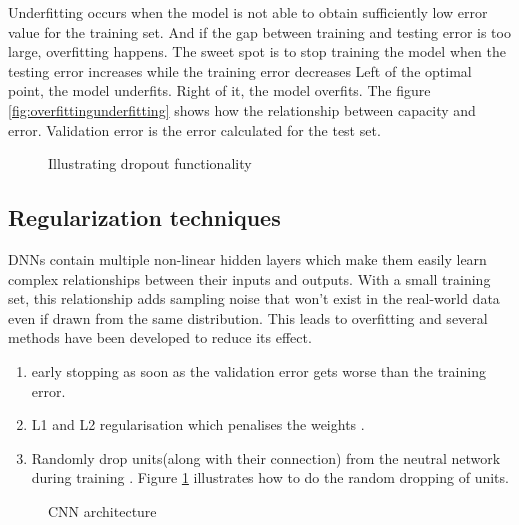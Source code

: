 Underfitting occurs when the model is not able to obtain sufficiently low error value for
the training set. And if the gap between training and testing error is too large,
overfitting happens. The sweet spot is to stop training the model when the testing error
increases while the training error  decreases
 \label{inside:formodelcheckpoint} Left of the optimal point, the model underfits. Right of
it, the model overfits. The figure \ref{fig:overfittingunderfitting} shows how the
relationship between capacity and error. Validation error is the error calculated for the test set.

\begin{figure}[h]
	\centering
    \def\svgwidth{0.6\textwidth}
    
    \caption{Illustrating dropout functionality}
    \label{fig:Dropout_function}
\end{figure}

\subsection{Regularization techniques}
DNNs contain multiple non-linear hidden layers which make them easily learn
complex relationships between their inputs and outputs. With a small training set, this
relationship adds sampling noise that won't exist in the real-world data even if drawn
from the same distribution. This leads to overfitting and several methods have been
developed to reduce its effect.
\begin{enumerate}
    \item early stopping as soon as the validation error gets worse than the training
        error. \label{item:earlystopping}
    \item L1 and L2 regularisation which penalises the weights \cite{Schmidhuber_2015}.
    \item Randomly drop units(along with their connection) from the neutral network during
        training \cite{dropoutpaper}. Figure \ref{fig:Dropout_function} illustrates how to
        do the random dropping of units.
\end{enumerate}
\begin{figure}[h]
    \centering
    \def\svgwidth{\textwidth}
    
    \caption{CNN architecture}
    \label{fig:cnnarchitecture}
\end{figure}

